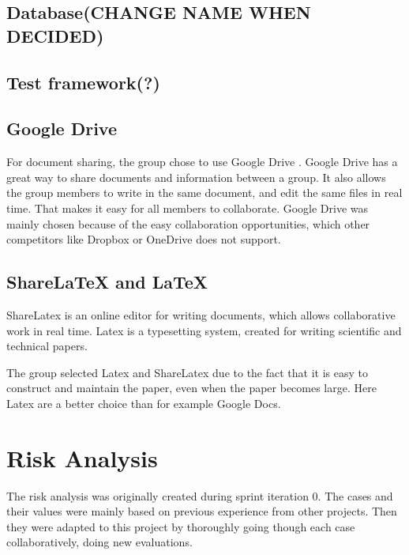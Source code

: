\subsection{Database(CHANGE NAME WHEN DECIDED)}
\subsection{Test framework(?)}

\subsection{Google Drive}
For document sharing, the group chose to use Google Drive \cite{GoogleDrive}. Google Drive has a great way to share documents and information between a group. It also allows the group members to write in the same document, and edit the same files in real time. That makes it easy for all members to collaborate. Google Drive was mainly chosen because of the easy collaboration opportunities, which other competitors like Dropbox or OneDrive does not support. 

\subsection{ShareLaTeX and LaTeX}
ShareLatex \cite{ShareLatex} is an online editor for writing documents, which allows collaborative work in real time. Latex is a typesetting system, created for writing scientific and technical papers. 

The group selected Latex and ShareLatex due to the fact that it is easy to construct and maintain the paper, even when the paper becomes large. Here Latex are a better choice than for example Google Docs.  

\section{Risk Analysis}

The risk analysis was originally created during sprint iteration 0. The cases and their values were mainly based on previous experience from other projects. Then they were adapted to this project by thoroughly going though each case collaboratively, doing new evaluations.

